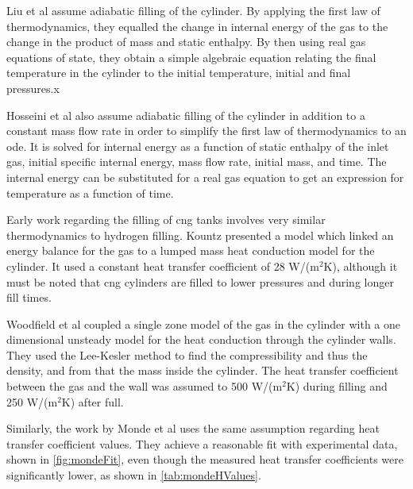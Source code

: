 Liu et al \cite{liu2010} assume adiabatic filling of the cylinder. By applying the first law of thermodynamics, they equalled the change in internal energy of the gas to the change in the product of mass and static enthalpy. By then using real gas equations of state, they obtain a simple algebraic equation relating the final temperature in the cylinder to the initial temperature, initial and final pressures.x

Hosseini et al \cite{Hosseini2012} also assume adiabatic filling of the cylinder in addition to a constant mass flow rate in order to simplify the first law of thermodynamics to an \gls{ode}. It is solved for internal energy as a function of static enthalpy of the inlet gas, initial specific internal energy, mass flow rate, initial mass, and time. The internal energy can be substituted for a real gas equation to get an expression for temperature as a function of time.

Early work regarding the filling of \gls{cng} tanks involves very similar thermodynamics to hydrogen filling. Kountz \cite{Kountz1994} presented a model which linked an energy balance for the gas to a lumped mass heat conduction model for the cylinder. It used a constant heat transfer coefficient of 28 W/(m$^2$K), although it must be noted that \gls{cng} cylinders are filled to lower pressures and during longer fill times.

Woodfield et al \cite{Woodfield2008} coupled a single zone model of the gas in the cylinder with a one dimensional unsteady model for the heat conduction through the cylinder walls. They used the Lee-Kesler method \cite{Lee1975} to find the compressibility and thus the density, and from that the mass inside the cylinder. The heat transfer coefficient between the gas and the wall was assumed to 500 W/(m$^2$K) during filling and 250 W/(m$^2$K) after full. 



Similarly, the work by Monde et al \cite{Monde2007} uses the same assumption regarding heat transfer coefficient values.  They achieve a reasonable fit with experimental data, shown in \cref{fig:mondeFit}, even though the measured heat transfer coefficients were significantly lower, as shown in \cref{tab:mondeHValues}.


